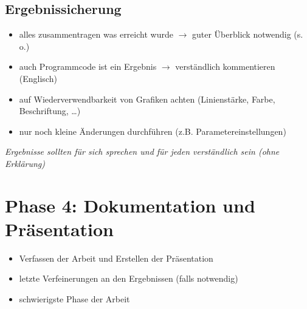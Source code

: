 \subsection*{Ergebnissicherung}
\label{sec:Ergebnissicherung}
\begin{itemize}
  \item alles zusammentragen was erreicht wurde $\rightarrow$ guter Überblick notwendig (s.\,o.)
  \item auch Programmcode ist ein Ergebnis $\rightarrow$ verständlich kommentieren (Englisch)
  \item auf  Wiederverwendbarkeit von Grafiken achten (Linienstärke, Farbe, Beschriftung, \ldots)
  \item nur noch kleine Änderungen durchführen (z.B. Parametereinstellungen)
\end{itemize}
\emph{Ergebnisse sollten für sich sprechen und für jeden verständlich sein (ohne Erklärung)}


\section{Phase 4: Dokumentation und Präsentation}
\label{sec:Dokumentation}

\begin{itemize}
  \item Verfassen der Arbeit und Erstellen der Präsentation
  \item letzte Verfeinerungen an den Ergebnissen (falls notwendig)
  \item schwierigste Phase der Arbeit
\end{itemize}


